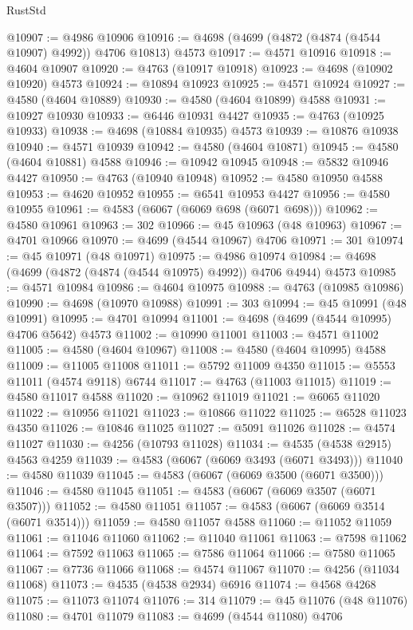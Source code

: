 \begin{lexlean}{RustStd}
\begin{coremodule}
@10907 := @4986 @10906
@10916 := @4698 (@4699 (@4872 (@4874 (@4544 @10907) @4992)) @4706 @10813) @4573
@10917 := @4571 @10916
@10918 := @4604 @10907
@10920 := @4763 (@10917 @10918)
@10923 := @4698 (@10902 @10920) @4573
@10924 := @10894 @10923
@10925 := @4571 @10924
@10927 := @4580 (@4604 @10889)
@10930 := @4580 (@4604 @10899) @4588
@10931 := @10927 @10930
@10933 := @6446 @10931 @4427
@10935 := @4763 (@10925 @10933)
@10938 := @4698 (@10884 @10935) @4573
@10939 := @10876 @10938
@10940 := @4571 @10939
@10942 := @4580 (@4604 @10871)
@10945 := @4580 (@4604 @10881) @4588
@10946 := @10942 @10945
@10948 := @5832 @10946 @4427
@10950 := @4763 (@10940 @10948)
@10952 := @4580 @10950 @4588
@10953 := @4620 @10952
@10955 := @6541 @10953 @4427
@10956 := @4580 @10955
@10961 := @4583 (@6067 (@6069 @698 (@6071 @698)))
@10962 := @4580 @10961
@10963 := 302
@10966 := @45 @10963 (@48 @10963)
@10967 := @4701 @10966
@10970 := @4699 (@4544 @10967) @4706
@10971 := 301
@10974 := @45 @10971 (@48 @10971)
@10975 := @4986 @10974
@10984 := @4698 (@4699 (@4872 (@4874 (@4544 @10975) @4992)) @4706 @4944) @4573
@10985 := @4571 @10984
@10986 := @4604 @10975
@10988 := @4763 (@10985 @10986)
@10990 := @4698 (@10970 @10988)
@10991 := 303
@10994 := @45 @10991 (@48 @10991)
@10995 := @4701 @10994
@11001 := @4698 (@4699 (@4544 @10995) @4706 @5642) @4573
@11002 := @10990 @11001
@11003 := @4571 @11002
@11005 := @4580 (@4604 @10967)
@11008 := @4580 (@4604 @10995) @4588
@11009 := @11005 @11008
@11011 := @5792 @11009 @4350
@11015 := @5553 @11011 (@4574 @9118) @6744
@11017 := @4763 (@11003 @11015)
@11019 := @4580 @11017 @4588
@11020 := @10962 @11019
@11021 := @6065 @11020
@11022 := @10956 @11021
@11023 := @10866 @11022
@11025 := @6528 @11023 @4350
@11026 := @10846 @11025
@11027 := @5091 @11026
@11028 := @4574 @11027
@11030 := @4256 (@10793 @11028)
@11034 := @4535 (@4538 @2915) @4563 @4259
@11039 := @4583 (@6067 (@6069 @3493 (@6071 @3493)))
@11040 := @4580 @11039
@11045 := @4583 (@6067 (@6069 @3500 (@6071 @3500)))
@11046 := @4580 @11045
@11051 := @4583 (@6067 (@6069 @3507 (@6071 @3507)))
@11052 := @4580 @11051
@11057 := @4583 (@6067 (@6069 @3514 (@6071 @3514)))
@11059 := @4580 @11057 @4588
@11060 := @11052 @11059
@11061 := @11046 @11060
@11062 := @11040 @11061
@11063 := @7598 @11062
@11064 := @7592 @11063
@11065 := @7586 @11064
@11066 := @7580 @11065
@11067 := @7736 @11066
@11068 := @4574 @11067
@11070 := @4256 (@11034 @11068)
@11073 := @4535 (@4538 @2934) @6916
@11074 := @4568 @4268
@11075 := @11073 @11074
@11076 := 314
@11079 := @45 @11076 (@48 @11076)
@11080 := @4701 @11079
@11083 := @4699 (@4544 @11080) @4706

\end{coremodule}
\end{lexlean}
